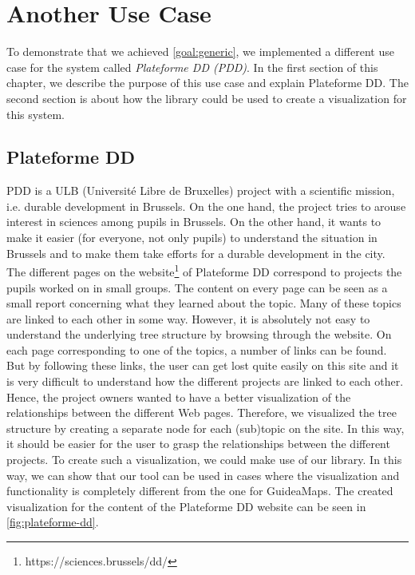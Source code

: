 \chapter{Another Use Case}\label{ch:usecase}
To demonstrate that we achieved \ref{goal:generic}, we implemented a different use case for the system called \textit{Plateforme DD (PDD)}. In the first section of this chapter, we describe the purpose of this use case and explain Plateforme DD. The second section is about how the library could be used to create a visualization for this system.

\section{Plateforme DD}\label{sec:pdd}
PDD is a ULB (Universit\'e Libre de Bruxelles) project with a scientific mission, i.e. durable development in Brussels. On the one hand, the project tries to arouse interest in sciences among pupils in Brussels. On the other hand, it wants to make it easier (for everyone, not only pupils) to understand the situation in Brussels and to make them take efforts for a durable development in the city.\\

The different pages on the website\footnote{https://sciences.brussels/dd/} of Plateforme DD correspond to projects the pupils worked on in small groups. The content on every page can be seen as a small report concerning what they learned about the topic. Many of these topics are linked to each other in some way. However, it is absolutely not easy to understand the underlying tree structure by browsing through the website. On each page corresponding to one of the topics, a number of links can be found. But by following these links, the user can get lost quite easily on this site and it is very difficult to understand how the different projects are linked to each other. Hence, the project owners wanted to have a better visualization of the relationships between the different Web pages. Therefore, we visualized the tree structure by creating a separate node for each (sub)topic on the site. In this way, it should be easier for the user to grasp the relationships between the different projects. To create such a visualization, we could make use of our library. In this way, we can show that our tool can be used in cases where the visualization and functionality is completely different from the one for GuideaMaps. The created visualization for the content of the Plateforme DD website can be seen in \autoref{fig:plateforme-dd}.


